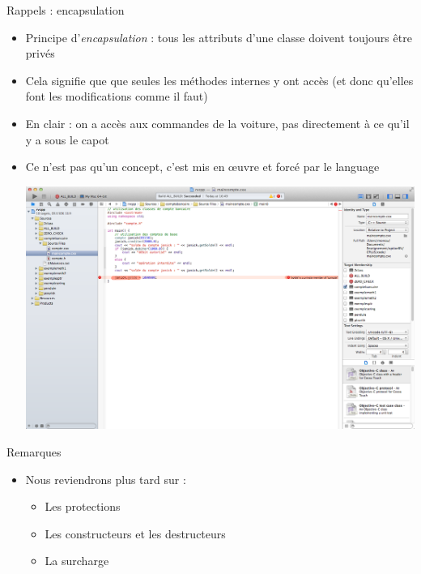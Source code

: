 \begin{frame}{Rappels : encapsulation}
\begin{itemize}
\item Principe d'\textit{encapsulation} : tous les attributs d'une classe
doivent toujours être privés
\item Cela signifie que que seules les méthodes internes y ont accès (et donc qu'elles font les modifications comme il faut)
\item En clair : on a accès aux commandes de la voiture, pas directement à ce qu'il y a sous le capot
\item Ce n'est pas qu'un concept, c'est mis en \oe uvre et forcé par le language
\begin{center}
\includegraphics[width=\textwidth]{fig/encapsulation.png}
\end{center}
\end{itemize}
\end{frame}

\begin{frame}{Remarques}
\begin{itemize}
\item Nous reviendrons plus tard sur :
\begin{itemize}
\item Les protections
\item Les constructeurs et les destructeurs
\item La surcharge
\end{itemize}
\end{itemize}
\end{frame}

